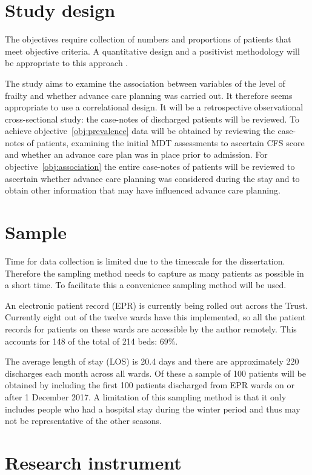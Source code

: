 \documentclass
[
	12pt,
	a4paper,
	oneside,
]{article}
\begin{document}
\section{Study design} 
\label{sec:design}
The objectives require collection of numbers
and proportions of patients that meet objective criteria. A quantitative design
and a positivist methodology will be appropriate to this approach \parencite{parahoo:14}.

The study aims to examine the association between variables of 
the level of frailty and whether advance care planning
was carried out. It therefore seems appropriate to use a correlational design. 
It will be a retrospective observational 
cross-sectional study: the case-notes of discharged patients will be reviewed. To achieve 
objective~\ref{obj:prevalence}
data will be obtained by reviewing the case-notes
of patients, examining the initial MDT assessments to ascertain CFS score and
whether an advance care plan was in place prior to admission. 
For objective~\ref{obj:association} the entire case-notes of patients 
will be reviewed to ascertain whether advance care planning 
was considered during the stay and to obtain other information that may have influenced
advance care planning.

\section{Sample}
Time for data collection is limited due to the timescale for the dissertation. 
Therefore the sampling method needs to capture as many patients as possible in a 
short time. To facilitate this a convenience sampling method will be used.

An electronic patient record (EPR) is currently being rolled out across the Trust.
Currently eight out of the twelve wards have this implemented, so all the patient 
records for patients on these wards are accessible by the author remotely. This
accounts for 148 of the total of 214 beds: 69\%. 

The average length of stay (LOS) is 20.4 days and there are approximately 220
discharges each month across all wards. Of these a sample of 100 patients 
will be obtained by including the first 100
patients discharged from EPR wards on or after 1 December 2017. A limitation
of this sampling method is that it only includes people who had a hospital stay
during the winter period and thus may not be representative of the other seasons.

\section{Research instrument}
\end{document}
